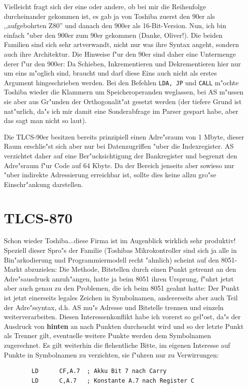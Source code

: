 \documentclass[12pt,a4paper,twoside]{report}
\newcommand{\bb}[1]{{\bf #1}}
\newcommand{\tty}[1]{{\tt #1}}
\newcommand{\asname}{AS}
\begin{document}
Vielleicht fragt sich der eine oder andere, ob bei mir die Reihenfolge
durcheinander gekommen ist, es gab ja von Toshiba zuerst den 90er als
,,aufgebohrten Z80'' und danach den 900er als 16-Bit-Version.  Nun, ich
bin einfach "uber den 900er zum 90er gekommen (Danke, Oliver!).  Die
beiden Familien sind sich sehr artverwandt, nicht nur was ihre Syntax
angeht, sondern auch ihre Architektur.  Die Hinweise f"ur den 90er sind
daher eine Untermenge derer f"ur den 900er: Da Schieben, Inkrementieren
und Dekrementieren hier nur um eins m"oglich sind, braucht und darf diese
Eins auch nicht als erstes Argument hingeschrieben werden.  Bei den
Befehlen \tty{LDA, JP} und \tty{CALL} m"ochte Toshiba wieder die
Klammern um Speicheroperanden weglassen, bei \asname{} m"ussen sie aber aus
Gr"unden der Orthogonalit"at gesetzt werden (der tiefere Grund ist
nat"urlich, da"s ich mir damit eine Sonderabfrage im Parser gespart habe,
aber das sagt man nicht so laut).
\par
Die TLCS-90er besitzen bereits prinzipiell einen Adre"sraum von 1
Mbyte, dieser Raum erschlie"st sich aber nur bei Datenzugriffen "uber
die Indexregister.  \asname{} verzichtet daher auf eine Ber"ucksichtigung
der Bankregister und begrenzt den Adre"sraum f"ur Code auf 64 Kbyte.
Da der Bereich jenseits aber sowieso nur "uber indirekte Adressierung
erreichbar ist, sollte dies keine allzu gro"se Einschr"ankung darstellen.


\section{TLCS-870}

Schon wieder Toshiba...diese Firma ist im Augenblick wirklich sehr
produktiv!  Speziell dieser Spro"s der Familie (Toshibas Mikrokontroller
sind sich ja alle in Bin"arkodierung und Programmiermodell recht "ahnlich)
scheint auf den 8051-Markt abzuzielen: Die Methode, Bitstellen durch einen
Punkt getrennt an den Adre"sausdruck anzuh"angen, hatte ja beim 8051 ihren
Ursprung, f"uhrt jetzt aber auch genau zu den Problemen, die ich beim 8051
geahnt hatte: Der Punkt ist jetzt einerseits legales Zeichen in Symbolnamen,
andererseits aber auch Teil der Adre"ssyntax, d.h. \asname{} mu"s Adresse und
Bitstelle trennen und einzeln weiterverarbeiten.  Diesen Interessenkonflikt
habe ich vorerst so gel"ost, da"s der Ausdruck von \bb{hinten} an nach
Punkten durchsucht wird und so der letzte Punkt als Trenner gilt, eventuelle
weitere Punkte werden dem Symbolnamen zugerechnet.  Es gilt weiterhin die
flehentliche Bitte, im eigenen Interesse auf Punkte in Symbolnamen zu
verzichten, sie f"uhren nur zu Verwirrungen:
\begin{verbatim}
        LD      CF,A.7  ; Akku Bit 7 nach Carry
        LD      C,A.7   ; Konstante A.7 nach Register C
\end{verbatim}
\end{document}
